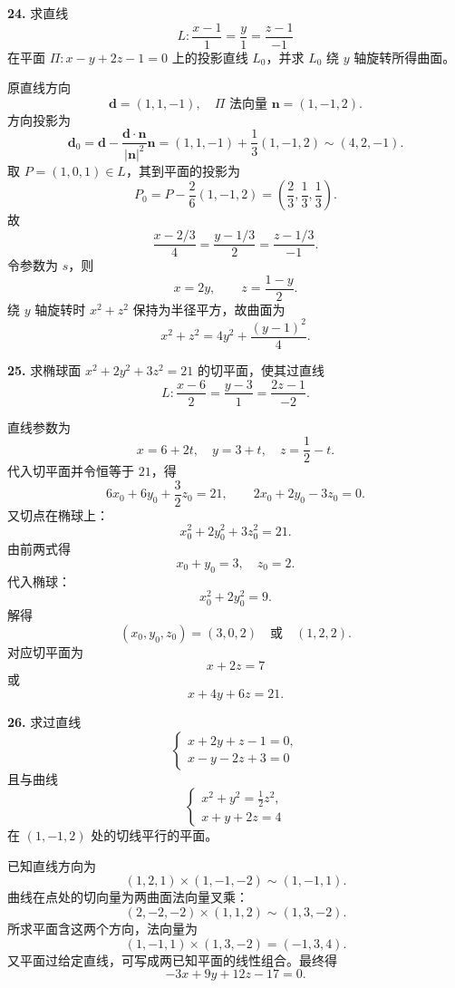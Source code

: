 \begin{problemblock}
\textbf{24.} 求直线
\[
L:\frac{x-1}{1}=\frac{y}{1}=\frac{z-1}{-1}
\]
在平面 \(\Pi:x-y+2z-1=0\) 上的投影直线 \(L_0\)，并求 \(L_0\) 绕 \(y\) 轴旋转所得曲面。
\end{problemblock}
\begin{solutionblock}
原直线方向
\[
\boldsymbol d=(1,1,-1),\quad \Pi\text{ 法向量 }\boldsymbol n=(1,-1,2).
\]
方向投影为
\[
\boldsymbol d_0=\boldsymbol d-\frac{\boldsymbol d\cdot\boldsymbol n}{|\boldsymbol n|^2}\boldsymbol n
=(1,1,-1)+\frac13(1,-1,2)\sim(4,2,-1).
\]
取 \(P=(1,0,1)\in L\)，其到平面的投影为
\[
P_0=P-\frac{2}{6}(1,-1,2)=\left(\frac23,\frac13,\frac13\right).
\]
故
\[
\boxed{\frac{x-2/3}{4}=\frac{y-1/3}{2}=\frac{z-1/3}{-1}}.
\]
令参数为 \(s\)，则
\[
x=2y,\qquad z=\frac{1-y}{2}.
\]
绕 \(y\) 轴旋转时 \(x^2+z^2\) 保持为半径平方，故曲面为
\[
\boxed{x^2+z^2=4y^2+\frac{(y-1)^2}{4}}.
\]
\end{solutionblock}

\begin{problemblock}
\textbf{25.} 求椭球面 \(x^2+2y^2+3z^2=21\) 的切平面，使其过直线
\[
L:\frac{x-6}{2}=\frac{y-3}{1}=\frac{2z-1}{-2}.
\]
\end{problemblock}
\begin{solutionblock}
直线参数为
\[
x=6+2t,\quad y=3+t,\quad z=\frac12-t.
\]
代入切平面并令恒等于 \(21\)，得
\[
6x_0+6y_0+\frac32z_0=21,\qquad
2x_0+2y_0-3z_0=0.
\]
又切点在椭球上：
\[
x_0^2+2y_0^2+3z_0^2=21.
\]
由前两式得
\[
x_0+y_0=3,\quad z_0=2.
\]
代入椭球：
\[
x_0^2+2y_0^2=9.
\]
解得
\[
(x_0,y_0,z_0)=(3,0,2)\quad\text{或}\quad(1,2,2).
\]
对应切平面为
\[
\boxed{x+2z=7}
\]
或
\[
\boxed{x+4y+6z=21}.
\]
\end{solutionblock}

\begin{problemblock}
\textbf{26.} 求过直线
\[
\begin{cases}x+2y+z-1=0,\\x-y-2z+3=0\end{cases}
\]
且与曲线
\[
\begin{cases}x^2+y^2=\frac12z^2,\\x+y+2z=4\end{cases}
\]
在 \((1,-1,2)\) 处的切线平行的平面。
\end{problemblock}
\begin{solutionblock}
已知直线方向为
\[
(1,2,1)\times(1,-1,-2)\sim(1,-1,1).
\]
曲线在点处的切向量为两曲面法向量叉乘：
\[
(2,-2,-2)\times(1,1,2)\sim(1,3,-2).
\]
所求平面含这两个方向，法向量为
\[
(1,-1,1)\times(1,3,-2)=(-1,3,4).
\]
又平面过给定直线，可写成两已知平面的线性组合。最终得
\[
\boxed{-3x+9y+12z-17=0}.
\]
\end{solutionblock}

